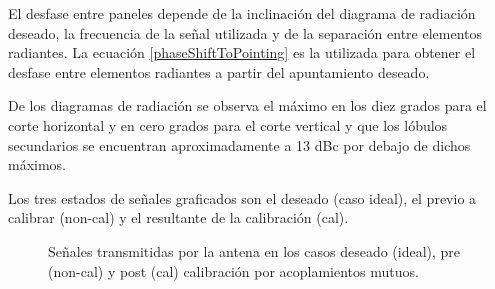 El desfase entre paneles depende de la inclinación del diagrama de radiación deseado, la frecuencia de la señal utilizada y de la
separación entre elementos radiantes. La ecuación \ref{phaseShiftToPointing} es la utilizada para obtener el desfase entre 
elementos radiantes a partir del apuntamiento deseado.


De los diagramas de radiación se observa el máximo en los diez grados para el corte horizontal y en cero grados para el corte
vertical y que los lóbulos secundarios se encuentran aproximadamente a 13 dBc por debajo de dichos máximos.

Los tres estados de señales graficados son el deseado (caso ideal), el previo a calibrar (non-cal) y el resultante de la
calibración (cal).
\begin{figure}[H]
	\centering

	\caption{Señales transmitidas por la antena en los casos deseado (ideal), pre (non-cal) y post (cal) calibración por acoplamientos mutuos.}
	\label{fig:nonErrMutual10degCol}
\end{figure}
